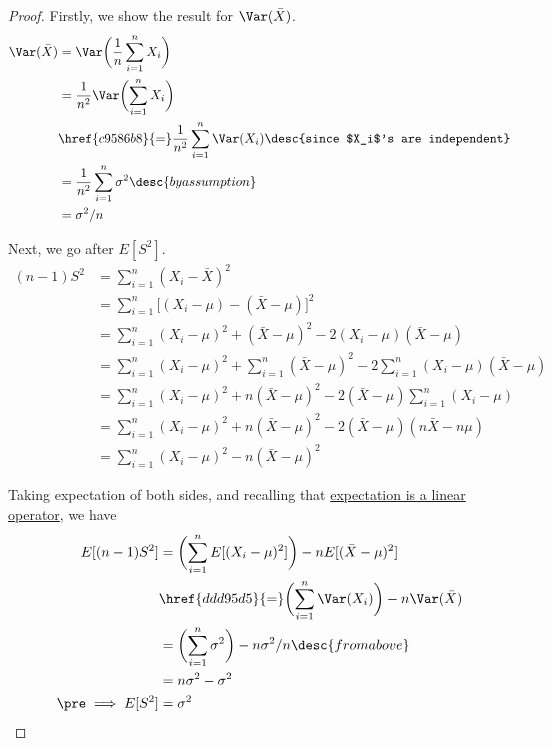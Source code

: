 \begin{proof}
  Firstly, we show the result for $\Var(\bar X)$.
  \begin{align*}
    \Var(\bar X) &=\Var\biggl(\frac1n\sum_{i=1}^nX_i\biggr)                                             \\
                 &=\frac1{n^2}\Var\biggl(\sum_{i=1}^nX_i\biggr)                                         \\
                 &\href{c9586b8}{=}\frac1{n^2}\sum_{i=1}^n\Var(X_i)\desc{since $X_i$'s are independent} \\
                 &=\frac1{n^2}\sum_{i=1}^n\sigma^2\desc{by assumption}                                  \\
                 &=\sigma^2/n
  \end{align*}

  Next, we go after $E[S^2]$.
  \begin{align*}
    (n-1)S^2 &=\sum_{i=1}^n(X_i-\bar X)^2                                                            \\
             &=\sum_{i=1}^n\bigl[(X_i-\mu)-(\bar X-\mu)\bigr]^2                                      \\
             &=\sum_{i=1}^n(X_i-\mu)^2+(\bar X-\mu)^2-2(X_i-\mu)(\bar X-\mu)                         \\
             &=\sum_{i=1}^n(X_i-\mu)^2+\sum_{i=1}^n(\bar X-\mu)^2-2\sum_{i=1}^n(X_i-\mu)(\bar X-\mu) \\
             &=\sum_{i=1}^n(X_i-\mu)^2+n(\bar X-\mu)^2-2(\bar X-\mu)\sum_{i=1}^n(X_i-\mu)            \\
             &=\sum_{i=1}^n(X_i-\mu)^2+n(\bar X-\mu)^2-2(\bar X-\mu)(n\bar X-n\mu)                   \\
             &=\sum_{i=1}^n(X_i-\mu)^2-n(\bar X-\mu)^2
  \end{align*}

  Taking expectation of both sides, and recalling that
  \href{e1bddba}{expectation is a linear operator}, we have
  \begin{align*}
    E[(n-1)S^2]         &=\biggl(\sum_{i=1}^nE[(X_i-\mu)^2]\biggr)-nE[(\bar X-\mu)^2]       \\
                        &\href{ddd95d5}{=}\biggl(\sum_{i=1}^n\Var(X_i)\biggr)-n\Var(\bar X) \\
                        &=\biggl(\sum_{i=1}^n\sigma^2\biggr)-n\sigma^2/n\desc{from above}   \\
                        &=n\sigma^2-\sigma^2                                                \\
    \pre\implies E[S^2] &=\sigma^2
  \end{align*}
\end{proof}

